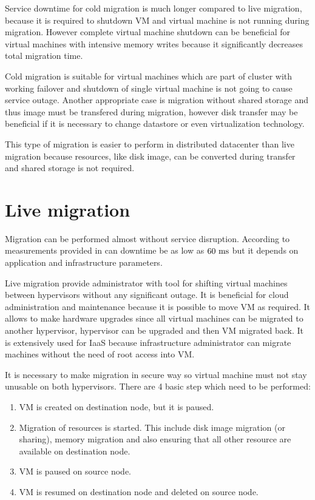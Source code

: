 Service downtime for cold migration is much longer compared to live migration, because it is required to shutdown \Ac{VM} and virtual machine is not running during migration. However complete virtual machine shutdown can be beneficial for virtual machines with intensive memory writes because it significantly decreases total migration time. 

Cold migration is suitable for virtual machines which are part of cluster with working failover and shutdown of single virtual machine is not going to cause service outage. Another appropriate case is migration without shared storage and thus image must be transfered during migration, however disk transfer may be beneficial if it is necessary to change datastore or even virtualization technology.

This type of migration is easier to perform in distributed datacenter than live migration because resources, like disk image, can be converted during transfer and shared storage is not required.


\section{Live migration}

Migration can be performed  almost without service disruption. According to measurements provided in \cite{live-migration-of-vms} can downtime be as low as $60~\mathrm{ms}$ but it depends on application and infrastructure parameters.

Live migration provide administrator with tool for shifting virtual machines between hypervisors without any significant outage. It is beneficial for cloud administration and maintenance because it is possible to move \Ac{VM} as required. It allows to make hardware upgrades since all virtual machines can be migrated to another hypervisor, hypervisor can be upgraded and then \Ac{VM} migrated back. 
It is extensively used for \Ac{IaaS} because infrastructure administrator can migrate machines without the need of root access into \Ac{VM}. 

It is necessary to make migration in secure way so virtual machine must not stay unusable on both hypervisors. There are 4 basic step which need to be performed:
\begin{enumerate}
	\item \Ac{VM} is created on destination node, but it is paused.
	\item Migration of resources is started. This include disk image migration (or sharing), memory migration and also ensuring that all other resource are available on destination node.
	\item \Ac{VM} is paused on source node.
	\item \Ac{VM} is resumed on destination node and deleted on source node.
\end{enumerate}

